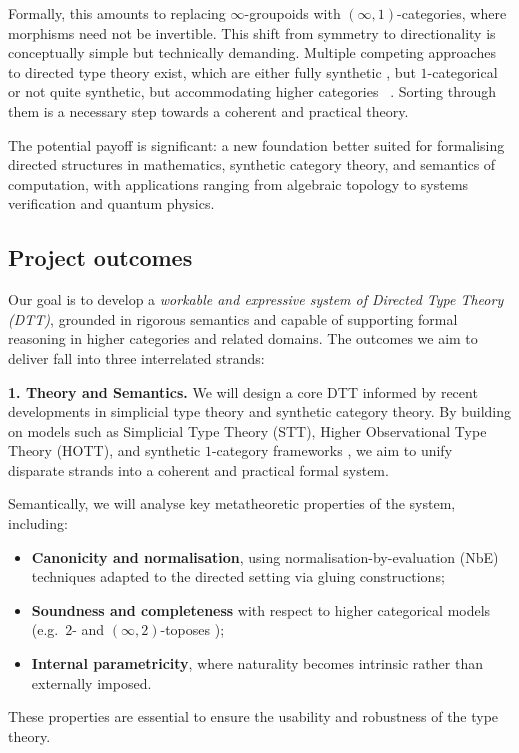 \documentclass[a4paper,11pt]{article}
\renewcommand{\paragraph}[1]{\textbf{#1.}}
\begin{document}
Formally, this amounts to replacing $\infty$-groupoids with
$(\infty,1)$-categories, where morphisms need not be invertible. This
shift from symmetry to directionality is conceptually simple but
technically demanding. Multiple competing approaches to directed type
theory exist, which are either fully synthetic \cite{licata:2011,north_2019,altenkirch_neumann_2024}, but $1$-categorical
or not quite synthetic, but accommodating higher categories~
\cite{riehlshulman2017}. Sorting through them is a necessary step towards a coherent and practical theory.

The potential payoff is significant: a new foundation better suited
for formalising directed structures in mathematics, synthetic category
theory, and semantics of computation, with applications ranging from
algebraic topology to systems verification and quantum physics.

\subsection{Project outcomes}\label{project-outcomes}

Our goal is to develop a \emph{workable and expressive system of
  Directed Type Theory (DTT)}, grounded in rigorous semantics and
capable of supporting formal reasoning in higher categories and
related domains. The outcomes we aim to deliver fall into three
interrelated strands:

\paragraph{1. Theory and Semantics}
We will design a core DTT informed by recent developments in
simplicial type theory and synthetic category theory.
By building on models such as Simplicial Type Theory (STT), Higher Observational Type Theory (HOTT), and synthetic $1$-category frameworks \cite{riehlshulman2017, licata2016, north_2019, altenkirch_neumann_2024}, we aim to unify disparate strands into a coherent and practical formal system.

Semantically, we will analyse key metatheoretic properties of the system, including:
\begin{itemize}
  \item \textbf{Canonicity and normalisation}, using normalisation-by-evaluation (NbE) techniques adapted to the directed setting via gluing constructions;
  \item \textbf{Soundness and completeness} with respect to higher
    categorical models
    (e.g.\ $2$- and $(\infty,2)$-toposes \cite{street2topos,abellan-martini});
  \item \textbf{Internal parametricity}, where naturality becomes intrinsic rather than externally imposed.
\end{itemize}
These properties are essential to ensure the usability and robustness of the type theory.
\end{document}
